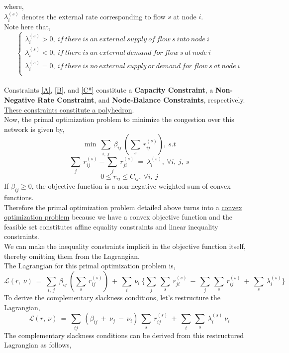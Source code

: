\documentclass[12pt, draftcls, onecolumn]{IEEEtran}
\begin{document}
where,
\\$\lambda_i^{(s)}$ denotes the external rate corresponding to flow $s$ at node $i$.
\\Note here that,
\begin{equation*}
    \begin{cases}
        \lambda_i^{(s)} > 0,\ if\ there\ is\ an\ external\ supply\ of\ flow\ s\ into\ node\ i\\
        \lambda_i^{(s)} < 0,\ if\ there\ is\ an\ external\ demand\ for\ flow\ s\ at\ node\ i\\
        \lambda_i^{(s)} = 0,\ if\ there\ is\ no\ external\ supply\ or\ demand\ for\ flow\ s\ at\ node\ i\\
    \end{cases}
\end{equation*}
\\Constraints \eqref{A}, \eqref{B}, and \eqref{C*} constitute a \textbf{Capacity Constraint}, a \textbf{Non-Negative Rate Constraint}, and \textbf{Node-Balance Constraints}, respectively. 
\\\underline{These constraints constitute a polyhedron}.
\\Now, the primal optimization problem to minimize the congestion over this network is given by,
\[\min\ \sum_{i,\ j}\ \beta_{ij}\ (\sum_s\ r_{ij}^{(s)}),\ s.t\]
\[\sum_j\ r_{ij}^{(s)} - \sum_j\ r_{ji}^{(s)}\ =\ \lambda_i^{(s)},\ \forall i,\ j,\ s\tag{*}\]
\[0 \leq r_{ij} \leq C_{ij},\ \forall i,\ j\]
If $\beta_{ij} \geq 0$, the objective function is a non-negative weighted sum of convex functions.
\\Therefore the primal optimization problem detailed above turns into a \underline{convex optimization problem} because we have a convex objective function and the feasible set constitutes affine equality constraints and linear inequality constraints.
\\We can make the inequality constraints implicit in the objective function itself, thereby omitting them from the Lagrangian.
\\The Lagrangian for this primal optimization problem is,
\[\mathcal{L}(r,\ \nu)\ =\ \sum_{i,\ j}\ \beta_{ij}\ (\sum_s\ r_{ij}^{(s)})\ +\ \sum_{i}\ \nu_i\ \big\{\sum_j\ \sum_s\ r_{ji}^{(s)}\ -\ \sum_j\ \sum_s\ r_{ij}^{(s)}\ +\ \sum_s\ \lambda_i^{(s)}\big\}\]
To derive the complementary slackness conditions, let's restructure the Lagrangian,
\[\mathcal{L}(r,\ \nu)\ =\ \sum_{ij}\ (\beta_{ij}\ +\ \nu_j\ -\ \nu_i)\ \sum_s\ r_{ij}^{(s)}\ +\ \sum_i\ \sum_s\ \lambda_i^{(s)}\ \nu_i\]
The complementary slackness conditions can be derived from this restructured Lagrangian as follows,
\end{document}
